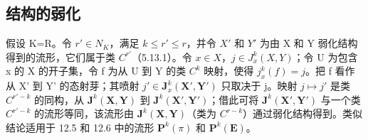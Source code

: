 \subsection{结构的弱化}

假设 K=R。令 \(r' \in N_{K}\)，满足 \(k \leqslant r' \leqslant r\)，并令 \(X'\) 和 \(Y'\) 为由 X 和 Y 弱化结构得到的流形，它们属于类 \(C^{r'}\)（5.13.1）。令 \(x \in X\)，\(j \in J_{x}^{k}(X, Y)\)；令 U 为包含 x 的 X 的开子集，令 f 为从 U 到 Y 的类 \(C^{k}\) 映射，使得 \(j_{x}^{k}(f) = j\)。把 f 看作从 X' 到 Y' 的态射芽；其喷射 \(j' \in \mathbf{J}_{x}^{k}(\mathbf{X}', \mathbf{Y}')\) 只取决于 j。映射 \(j \mapsto j'\) 是类 \(C^{r'-k}\) 的同构，从 \(\mathbf{J}^{k}(\mathbf{X}, \mathbf{Y})\) 到 \(\mathbf{J}^{k}(\mathbf{X}', \mathbf{Y}')\)；借此可将 \(\mathbf{J}^{k}(\mathbf{X}', \mathbf{Y}')\) 与一个类 \(C^{r'-k}\) 的流形等同，该流形由 \(\mathbf{J}^{k}(\mathbf{X}, \mathbf{Y})\)（类为 \(C^{r-k}\)）通过弱化结构得到。类似结论适用于 12.5 和 12.6 中的流形 \(\mathbf{P}^{k}(\pi)\) 和 \(\mathbf{P}^{k}(\mathbf{E})\)。

